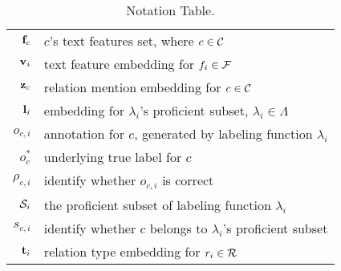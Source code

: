 

\begin{table}[t]
\begin{small}
\begin{tabular}{r|l}
\hline
$\f_c$	&	$c$'s text features set, where $c \in \C$\\
$\v_i$	&	text feature embedding  for $f_i \in \F$\\
$\z_c$	&	relation mention embedding  for $c \in \C$\\
$\l_i$	&	embedding for $\lambda_i$'s proficient subset, $\lambda_i \in \Lambda$\\
$o_{c, i}$ &	annotation for $c$, generated by labeling function $\lambda_i$ \\
$o_c^*$	&	underlying true label for $c$ \\

$\rho_{c, i}$ & identify whether $o_{c, i}$ is correct \\
$\S_i$	&	the proficient subset of labeling function $\lambda_i$\\
$s_{c, i}$ & identify whether $c$ belongs to $\lambda_i$'s proficient subset\\
$\t_i$	&	relation type embedding for $r_i \in \R$\\
\hline
\end{tabular}
\end{small}
\caption{Notation Table.}
\label{tab:notation}
\end{table}


